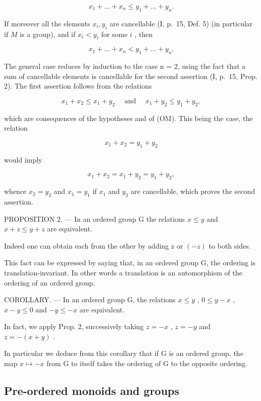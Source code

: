 \[
x _ {1} + \dots + x _ {n} \leqslant y _ {1} + \dots + y _ {n}.
\]

If moreover all the elements \(x_{i}, y_{i}\) are cancellable (I, p.~15, Def. 5) (in particular if \(M\) is a group), and if \(x_{i} < y_{i}\) for some \(i\) , then

\[
x _ {1} + \dots + x _ {n} <   y _ {1} + \dots + y _ {n}.
\]

The general case reduces by induction to the case n = 2, using the fact that a sum of cancellable elements is cancellable for the second assertion (I, p.~15, Prop. 2). The first assertion follows from the relations

\[
x _ {1} + x _ {2} \leqslant x _ {1} + y _ {2} \quad \text { and } \quad x _ {1} + y _ {2} \leqslant y _ {1} + y _ {2},
\]

which are consequences of the hypotheses and of (OM). This being the case, the relation

\[
x _ {1} + x _ {2} = y _ {1} + y _ {2}
\]

would imply

\[
x _ {1} + x _ {2} = x _ {1} + y _ {2} = y _ {1} + y _ {2},
\]

whence \(x_{2} = y_{2}\) and \(x_{1} = y_{1}\) if \(x_{1}\) and \(y_{2}\) are cancellable, which proves the second assertion.

PROPOSITION 2. --- In an ordered group G the relations \(x \leqslant y\) and \(x + z \leqslant y + z\) are equivalent.

Indeed one can obtain each from the other by adding z or \((-z)\) to both sides.

This fact can be expressed by saying that, in an ordered group G, the ordering is translation-invariant. In other words a translation is an automorphism of the ordering of an ordered group.

COROLLARY. --- In an ordered group G, the relations \(x \leqslant y\) , \(0 \leqslant y - x\) , \(x - y \leqslant 0\) and \(-y \leqslant -x\) are equivalent.

In fact, we apply Prop. 2, successively taking \(z = -x\) , \(z = -y\) and \(z = - (x + y)\) .

In particular we deduce from this corollary that if G is an ordered group, the map \(x \mapsto -x\) from G to itself takes the ordering of G to the opposite ordering.

\subsection{Pre-ordered monoids and groups}

